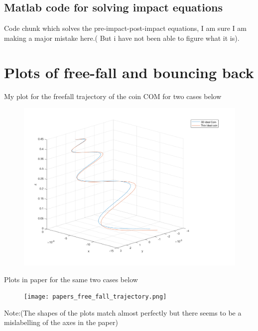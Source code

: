 \documentclass[11pt]{myclass}
\begin{document}
\subsection{Matlab code for solving impact equations}
Code chunk which solves the pre-impact-post-impact equations, I am sure I am making a major mistake here.( But i have not been able to figure what it is).

\section{\textbf{Plots of free-fall and bouncing back}}
My plot for the freefall trajectory of the coin COM for two cases below
\begin{figure}[H]
\includegraphics[scale = 0.4]{free_fall.png}
\end{figure}
Plots in paper for the same two cases below
\begin{figure}[H]
\texttt{[image: papers\_free\_fall\_trajectory.png]}
\end{figure}
Note:(The shapes of the plots match almost perfectly but there seems to be a mislabelling of the axes in the paper)\\
\end{document}
